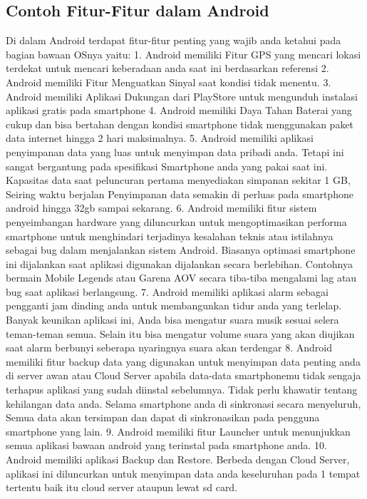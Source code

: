 		\subsection{Contoh Fitur-Fitur dalam Android}
		Di dalam Android terdapat fitur-fitur penting yang wajib anda ketahui pada bagian bawaan OSnya yaitu:
		1.	Android memiliki Fitur GPS yang mencari lokasi terdekat untuk mencari keberadaan anda saat ini berdasarkan referensi \cite{anwar2014implementasi}
		2.	Android memiliki Fitur Menguatkan Sinyal saat kondisi tidak menentu.
		3.	Android memiliki Aplikasi Dukungan dari PlayStore untuk mengunduh instalasi aplikasi gratis pada smartphone
		4.	Android memiliki Daya Tahan Baterai yang cukup dan bisa bertahan dengan kondisi smartphone tidak menggunakan paket data internet
			hingga 2 hari maksimalnya.
		5.	Android memiliki aplikasi penyimpanan data yang luas untuk menyimpan data pribadi anda. Tetapi ini sangat bergantung pada spesifikasi
			Smartphone anda yang pakai saat ini. Kapasitas data saat peluncuran pertama menyediakan simpanan sekitar 1 GB, Seiring waktu berjalan
			Penyimpanan data semakin di perluas pada smartphone android hingga 32gb sampai sekarang.
		6. 	Android memiliki fitur sistem penyeimbangan hardware yang diluncurkan untuk mengoptimasikan performa smartphone untuk menghindari terjadinya
			kesalahan teknis atau istilahnya sebagai bug dalam menjalankan sistem Android. Biasanya optimasi smartphone ini dijalankan saat aplikasi digunakan
			dijalankan secara berlebihan. Contohnya bermain Mobile Legends atau Garena AOV secara tiba-tiba mengalami lag atau bug saat aplikasi berlangsung.
		7. 	Android memiliki aplikasi alarm sebagai pengganti jam dinding anda untuk membangunkan tidur anda yang terlelap. Banyak keunikan aplikasi ini,
			Anda bisa mengatur suara musik sesuai selera teman-teman semua. Selain itu bisa mengatur volume suara yang akan diujikan saat alarm berbunyi seberapa nyaringnya suara akan terdengar
		8.	Android memiliki fitur backup data yang digunakan untuk menyimpan data penting anda di server awan atau Cloud Server apabila data-data smartphonemu tidak sengaja terhapus aplikasi yang sudah diinstal sebelumnya.
			Tidak perlu khawatir tentang kehilangan data anda. Selama smartphone anda di sinkronasi secara menyeluruh, Semua data akan tersimpan dan dapat di sinkronasikan pada pengguna smartphone yang lain.
		9.	Android memiliki fitur Launcher untuk menunjukkan semua aplikasi bawaan android yang terinstal pada smartphone anda.
		10.	Android memiliki aplikasi Backup dan Restore. Berbeda dengan Cloud Server, aplikasi ini diluncurkan untuk menyimpan data anda keseluruhan pada 1 tempat tertentu baik itu cloud server ataupun lewat sd card.
